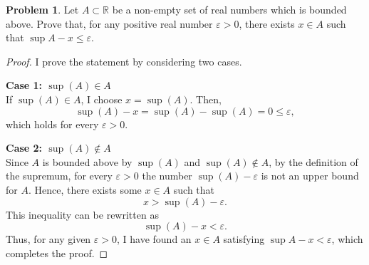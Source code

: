 \documentclass[12pt,oneside]{article}
\theoremstyle{definition}
\newtheorem{problem}{Problem}
\begin{document}
\newpage

\begin{problem}
Let \( A \subset \mathbb{R} \) be a non-empty set of real numbers which is bounded above. 
Prove that, for any positive real number \(\varepsilon > 0\), there exists \(x \in A\) such that \(\sup A - x \leq \varepsilon\).
\end{problem}

\begin{proof}
I prove the statement by considering two cases.

\medskip

\noindent\textbf{Case 1: \( \sup(A) \in A \)}\\
If \( \sup(A) \in A \), I choose \( x = \sup(A) \). Then,
\[
\sup(A) - x = \sup(A) - \sup(A) = 0 \leq \varepsilon,
\]
which holds for every \(\varepsilon > 0\).

\medskip

\noindent\textbf{Case 2: \( \sup(A) \notin A \)}\\
Since \( A \) is bounded above by \( \sup(A) \) and \( \sup(A) \notin A \), by the definition of the supremum, for every \(\varepsilon > 0\) the number \( \sup(A) - \varepsilon \) is not an upper bound for \( A \). Hence, there exists some \( x \in A \) such that
\[
x > \sup(A) - \varepsilon.
\]
This inequality can be rewritten as
\[
\sup(A) - x < \varepsilon.
\]
Thus, for any given \(\varepsilon > 0\), I have found an \( x \in A \) satisfying \(\sup A - x < \varepsilon\), which completes the proof.
\end{proof}
\end{document}
